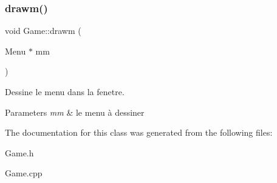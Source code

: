 \subsubsection{\texorpdfstring{drawm()}{drawm()}}
{\footnotesize\ttfamily void Game\+::drawm (\begin{DoxyParamCaption}\item[{Menu $\ast$}]{mm }\end{DoxyParamCaption})}



Dessine le menu dans la fenetre. 


\begin{DoxyParams}{Parameters}
{\em mm} & le menu à dessiner \\
\hline
\end{DoxyParams}


The documentation for this class was generated from the following files\+:\begin{DoxyCompactItemize}
\item 
Game.\+h\item 
Game.\+cpp\end{DoxyCompactItemize}
